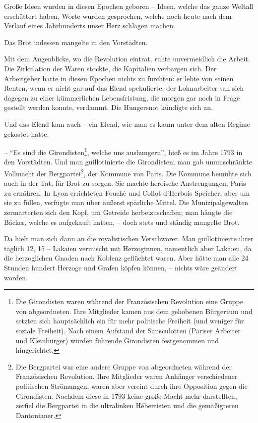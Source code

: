 \documentclass{scrbook}
\begin{document}
Große Ideen wurden in diesen Epochen geboren – Ideen, welche das ganze Weltall erschüttert haben, Worte wurden gesprochen, welche noch heute nach dem Verlauf eines Jahrhunderts unser Herz schlagen machen.

Das Brot indessen mangelte in den Vorstädten.

Mit dem Augenblicke, wo die Revolution eintrat, ruhte unvermeidlich die Arbeit. Die Zirkulation der Waren stockte, die Kapitalien verbargen sich. Der Arbeitgeber hatte in diesen Epochen nichts zu fürchten: er lebte von seinen Renten, wenn er nicht gar auf das Elend spekulierte; der Lohnarbeiter sah sich dagegen zu einer kümmerlichen Lebensfristung, die morgen gar noch in Frage gestellt werden konnte, verdammt. Die Hungersnot kündigte sich an.

Und das Elend kam auch – ein Elend, wie man es kaum unter dem alten Regime gekostet hatte.

– ``Es sind die Girondisten\footnote{Die Girondisten waren während der Französischen Revolution eine Gruppe von abgeordneten. Ihre Mitglieder kamen aus dem gehobenen Bürgertum und setzten sich hauptsächlich ein für mehr politische Freiheit (und weniger für soziale Freiheit). Nach einem Aufstand der Sansculotten (Pariser Arbeiter und Kleinbürger) würden führende Girondisten festgenommen und hingerichtet.}, welche uns aushungern''‚ hieß es im Jahre 1793 in den Vorstädten. Und man guillotinierte die Girondisten; man gab unumschränkte Vollmacht der Bergpartei\footnote{Die Bergpartei war eine andere Gruppe von abgeordneten während der Französischen Revolution. Ihre Mitglieder waren Anhänger verschiedener politischen Strömungen, waren aber vereint durch ihre Opposition gegen die Girondisten. Nachdem diese in 1793 keine große Macht mehr darstellten, zerfiel die Bergpartei in die ultralinken Hébertisten und die gemäßigteren Dantonianer.}, der Kommune von Paris. Die Kommune bemühte sich auch in der Tat, für Brot zu sorgen. Sie machte heroische Anstrengungen, Paris zu ernähren. In Lyon errichteten Fouché und Collot d’Herbois Speicher, aber um sie zu füllen, verfügte man über äußerst spärliche Mittel. Die Munizipalgewalten zermarterten sich den Kopf, um Getreide herbeizuschaffen; man hängte die Bäcker, welche es aufgekauft hatten, – doch stets und ständig mangelte Brot.

Da hielt man sich dann an die royalistischen Verschwörer. Man guillotinierte ihrer täglich 12, 15 – Lakaien vermischt mit Herzoginnen, namentlich aber Lakaien, da die herzoglichen Gnaden nach Koblenz geflüchtet waren. Aber hätte man alle 24 Stunden hundert Herzoge und Grafen köpfen können, – nichts wäre geändert worden.
\end{document}
